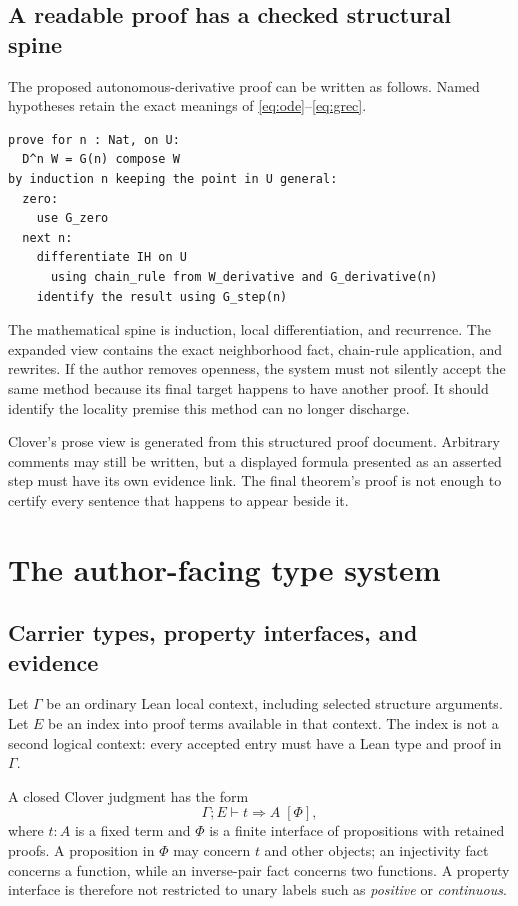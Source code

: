 \documentclass[11pt,a4paper]{article}
\theoremstyle{definition}
\theoremstyle{remark}
\begin{document}
\subsection{A readable proof has a checked structural spine}

The proposed autonomous-derivative proof can be written as follows. Named
hypotheses retain the exact meanings of \eqref{eq:ode}--\eqref{eq:grec}.
\begin{lstlisting}
prove for n : Nat, on U:
  D^n W = G(n) compose W
by induction n keeping the point in U general:
  zero:
    use G_zero
  next n:
    differentiate IH on U
      using chain_rule from W_derivative and G_derivative(n)
    identify the result using G_step(n)
\end{lstlisting}
The mathematical spine is induction, local differentiation, and recurrence.
The expanded view contains the exact neighborhood fact, chain-rule application,
and rewrites. If the author removes openness, the system must not silently
accept the same method because its final target happens to have another proof.
It should identify the locality premise this method can no longer discharge.

Clover's prose view is generated from this structured proof document. Arbitrary
comments may still be written, but a displayed formula presented as an asserted
step must have its own evidence link. The final theorem's proof is not enough
to certify every sentence that happens to appear beside it.

\section{The author-facing type system}\label{sec:types}

\subsection{Carrier types, property interfaces, and evidence}

Let $\Gamma$ be an ordinary Lean local context, including selected structure
arguments. Let $E$ be an index into proof terms available in that context.
The index is not a second logical context: every accepted entry must have a
Lean type and proof in $\Gamma$.

A closed Clover judgment has the form
\[
 \Gamma;E\vdash t\Rightarrow A\;[\Phi],
\]
where $t:A$ is a fixed term and $\Phi$ is a finite interface of propositions
with retained proofs. A proposition in $\Phi$ may concern $t$ and other
objects; an injectivity fact concerns a function, while an inverse-pair fact
concerns two functions. A property interface is therefore not restricted to
unary labels such as \emph{positive} or \emph{continuous}.
\end{document}
